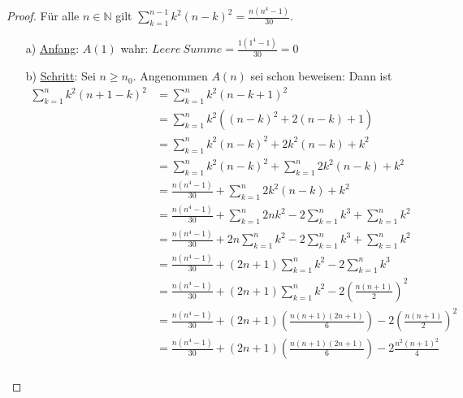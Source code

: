\documentclass{exam}
\begin{document}
\begin{proof}
	Für alle $n \in \mathbb{N}$ gilt $\sum_{k = 1}^{n - 1} k^2(n - k)^2 = \frac{n(n^4 - 1)}{30}$.
	\begin{enumerate}
		\item[a)] \underline{Anfang}: $A(1)$ wahr: $Leere\ Summe = \frac{1(1^4 - 1)}{30} = 0$
		\item[b)] \underline{Schritt}: Sei $n \ge n_0$. Angenommen $A(n)$ sei schon beweisen: Dann ist
		      \begin{align}
			      \sum_{k = 1}^{n} k^2(n + 1 - k)^2 & = \sum_{k = 1}^{n} k^2(n - k + 1)^2                                                                       \\
			                                        & = \sum_{k = 1}^{n} k^2((n - k)^2 + 2(n-k)+ 1)                                                             \\
			                                        & = \sum_{k = 1}^{n} k^2(n - k)^2 + 2k^2(n-k) + k^2                                                         \\
			                                        & = \sum_{k = 1}^{n} k^2(n - k)^2 + \sum_{k=1}^{n} 2k^2(n-k) + k^2                                          \\
			                                        & = \frac{n(n^4 - 1)}{30} + \sum_{k=1}^{n} 2k^2(n-k) + k^2                                                  \\
			                                        & = \frac{n(n^4 - 1)}{30} + \sum_{k=1}^{n} 2nk^2 - 2\sum_{k=1}^{n} k^3 + \sum_{k=1}^{n} k^2                 \\
			                                        & = \frac{n(n^4 - 1)}{30} + 2n\sum_{k=1}^{n} k^2 - 2\sum_{k=1}^{n} k^3 + \sum_{k=1}^{n} k^2                 \\
			                                        & = \frac{n(n^4 - 1)}{30} + (2n+1)\sum_{k=1}^{n} k^2 - 2\sum_{k=1}^{n} k^3 \tag{aus 1.a}                    \\
			                                        & = \frac{n(n^4 - 1)}{30} + (2n+1)\sum_{k=1}^{n} k^2 - 2\left(\frac{n(n+1)}{2}\right)^2 \tag{aus Vorlesung} \\
			                                        & = \frac{n(n^4 - 1)}{30} + (2n+1)\left(\frac{n(n+1)(2n+1)}{6}\right) - 2\left(\frac{n(n+1)}{2}\right)^2    \\
			                                        & = \frac{n(n^4 - 1)}{30} + (2n+1)\left(\frac{n(n+1)(2n+1)}{6}\right) - 2\frac{n^2(n+1)^2}{4}               \\

\end{align}
\end{enumerate}
\end{proof}
\end{document}
